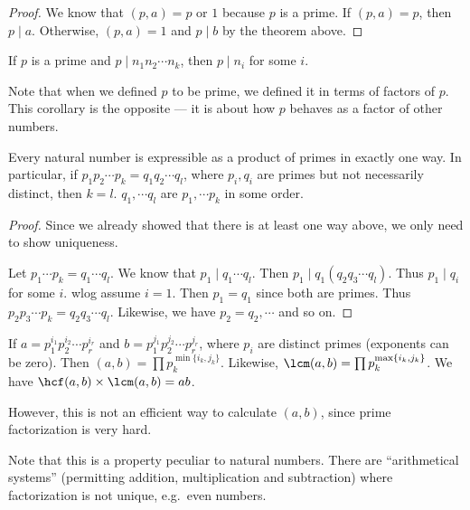 \documentclass[a4paper]{article}
\begin{document}
\begin{proof}
  We know that $(p, a) = p$ or $1$ because $p$ is a prime. If $(p, a) = p$, then $p \mid a$. Otherwise, $(p, a) = 1$ and $p \mid b$ by the theorem above.
\end{proof}

\begin{cor}
  If $p$ is a prime and $p\mid n_1n_2\cdots n_k$, then $p \mid n_i$ for some $i$.
\end{cor}
Note that when we defined $p$ to be prime, we defined it in terms of factors of $p$. This corollary is the opposite --- it is about how $p$ behaves as a factor of other numbers.

\begin{thm}
  Every natural number is expressible as a product of primes in exactly one way. In particular, if $p_1p_2\cdots p_k = q_1q_2\cdots q_l$, where $p_i, q_i$ are primes but not necessarily distinct, then $k = l$. $q_1, \cdots q_l$ are $p_1, \cdots p_k$ in some order.
\end{thm}

\begin{proof}
  Since we already showed that there is at least one way above, we only need to show uniqueness.

  Let $p_1\cdots p_k = q_1\cdots q_l$. We know that $p_1 \mid q_1\cdots q_l$. Then $p_1 \mid q_1(q_2q_3\cdots q_l)$. Thus $p_1 \mid q_i$ for some $i$. wlog assume $i = 1$. Then $p_1 = q_1$ since both are primes. Thus $p_2p_3 \cdots p_k = q_2q_3\cdots q_l$. Likewise, we have $p_2 = q_2, \cdots$ and so on.
\end{proof}

\begin{cor}
  If $a = p_1^{i_1}p_2^{i_2}\cdots p_r^{i_r}$ and $b = p_1^{j_1}p_2^{j_2}\cdots p_r^{j_r}$, where $p_i$ are distinct primes (exponents can be zero). Then $(a, b)=\prod p_k^{\min\{i_k, j_k\}}$. Likewise, $\lcm(a, b) = \prod p_k^{\max\{i_k, j_k\}}$. We have $\hcf(a, b)\times\lcm(a, b) = ab$.
\end{cor}
However, this is not an efficient way to calculate $(a, b)$, since prime factorization is very hard.

Note that this is a property peculiar to natural numbers. There are ``arithmetical systems'' (permitting addition, multiplication and subtraction) where factorization is not unique, e.g.\ even numbers.
\end{document}
